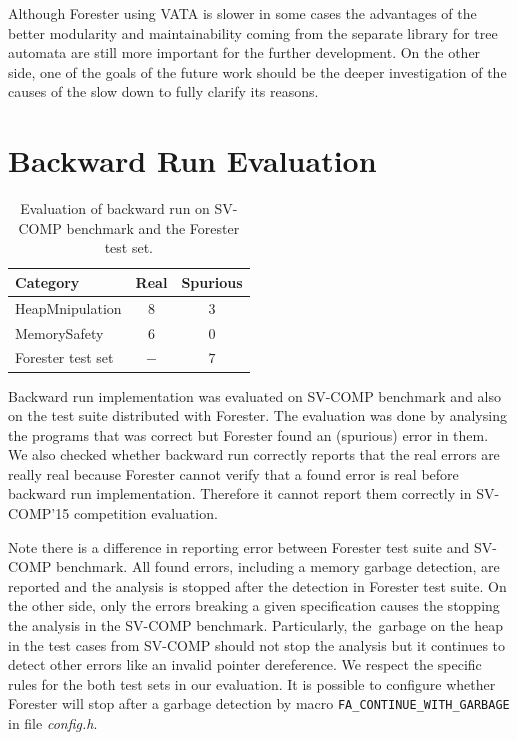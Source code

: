 Although Forester using VATA is slower in some cases
the advantages of the better modularity
and maintainability coming from the separate library
for tree automata are still more important
for the further development.
On the other side, one of the goals of the future work should be
the deeper investigation of the causes of the slow down
to fully clarify its reasons.


\section{Backward Run Evaluation}
\label{sec:bweval}

\begin{table}[bt]
	\vskip6pt
	\caption{Evaluation of backward run on SV-COMP benchmark
		and the Forester test set.
	}
	\centering
	\begin{tabular}{| l | c | c |}
		\hline
		Category & Real & Spurious \\
		\hline
		\hline
		HeapMnipulation & $8$ & $3$ \\
		\hline
		MemorySafety & $6$ & $0$ \\
		\hline
		Forester test set & $-$ & $7$ \\
		\hline
	\end{tabular}
	\label{tab:bwres}
\end{table}

Backward run implementation was evaluated on SV-COMP benchmark
and also on the test suite distributed with Forester.
The evaluation was done by analysing the programs that was correct
but Forester found an (spurious) error in them.
We also checked whether backward run correctly
reports that the real errors are really real
because Forester cannot verify
that a found error is real before backward run implementation.
Therefore it cannot report them correctly in SV-COMP'15 competition
evaluation.

Note there is a difference in reporting error between
Forester test suite and SV-COMP benchmark.
All found errors, including a memory garbage detection, are reported
and the analysis is stopped after the detection in Forester test suite.
On the other side, only the errors breaking a given specification
causes the stopping the analysis in the SV-COMP benchmark.
Particularly, the~garbage on the heap in the test cases from SV-COMP should not
stop the analysis but it continues to
detect other errors like an invalid pointer dereference.
We respect the specific rules for the both test sets in our evaluation.
It is possible to configure whether
Forester will stop after a garbage detection by
macro {\tt FA\_CONTINUE\_WITH\_GARBAGE} in file \emph{config.h}.

